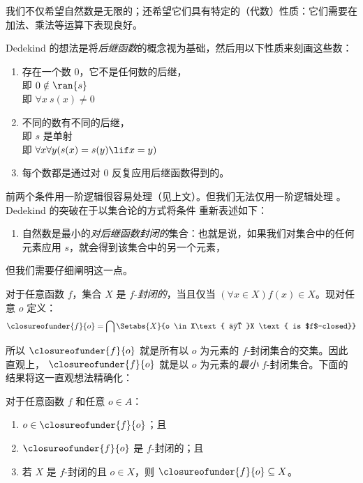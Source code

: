 \documentclass[../../../include/open-logic-section]{subfiles}
\begin{document}

我们不仅希望自然数是无限的；还希望它们具有特定的（代数）性质：它们需要在加法、乘法等运算下表现良好。

Dedekind 的想法是将\emph{后继函数}的概念视为基础，然后用以下性质来刻画这些数：
\begin{enumerate}
	\item 存在一个数 $0$，它不是任何数的后继，
	\\即 $0 \notin \ran{s}$
	\\即 $\forall x\ s(x) \neq 0$
	\item 不同的数有不同的后继，
	\\即 $s$ 是单射
	\\即 $\forall x \forall y (s(x) = s(y) \lif x = y)$
	\item{} 每个数都是通过对 $0$ 反复应用后继函数得到的。
\end{enumerate}
前两个条件用一阶逻辑很容易处理（见上文）。但我们无法仅用一阶逻辑处理 。Dedekind 的突破在于以集合论的方式将条件  重新表述如下：
\begin{enumerate}
	\item[3$'$.] 自然数是最小的\emph{对后继函数封闭的}集合：也就是说，如果我们对集合中的任何元素应用 $s$，就会得到该集合中的另一个元素，
\end{enumerate}

但我们需要仔细阐明这一点。

\begin{defn}
	对于任意函数 $f$，集合 $X$ 是 $f$-\emph{封闭的}，当且仅当
	$(\forall x \in X)f(x) \in X$。现对任意 $o$ 定义：
	$$\closureofunder{f}{o} = \bigcap\Setabs{X}{o \in X\text{ 且 }X
\text{ is $f$-closed}}$$
\end{defn}


所以 $\closureofunder{f}{o}$ 就是所有以 $o$ 为元素的 $f$-封闭集合的交集。因此直观上，
$\closureofunder{f}{o}$ 就是以 $o$ 为元素的\emph{最小} $f$-封闭集合。下面的结果将这一直观想法精确化：
\begin{lem}
	对于任意函数 $f$ 和任意 $o \in A$：
	\begin{enumerate}
		\item{} $o \in \closureofunder{f}{o}$；且
		\item{} $\closureofunder{f}{o}$ 是 $f$-封闭的；且
		\item{} 若 $X$ 是 $f$-封闭的且 $o \in
		X$，则 $\closureofunder{f}{o} \subseteq X$。
	\end{enumerate}
\end{lem}
\end{document}
